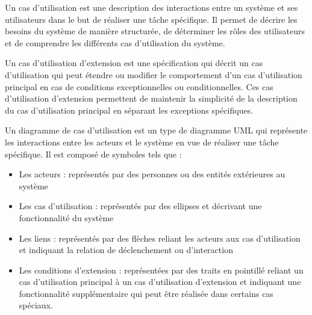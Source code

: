 \begin{definition}
Un cas d'utilisation est une description des interactions entre un système et ses utilisateurs dans le but de réaliser une tâche spécifique. Il permet de décrire les besoins du système de manière structurée, de déterminer les rôles des utilisateurs et de comprendre les différents cas d'utilisation du système.
\end{definition}
\begin{definition}
Un cas d'utilisation d'extension est une spécification qui décrit un cas d'utilisation qui peut étendre ou modifier le comportement d'un cas d'utilisation principal en cas de conditions exceptionnelles ou conditionnelles. Ces cas d'utilisation d'extension permettent de maintenir la simplicité de la description du cas d'utilisation principal en séparant les exceptions spécifiques.
\end{definition}

Un diagramme de cas d'utilisation est un type de diagramme UML qui représente les interactions entre les acteurs et le système en vue de réaliser une tâche spécifique. Il est composé de symboles tels que :
\begin{itemize}
\item Les acteurs : représentés par des personnes ou des entités extérieures au système
\item Les cas d'utilisation : représentés par des ellipses et décrivant une fonctionnalité du système
\item Les liens : représentés par des flèches reliant les acteurs aux cas d'utilisation et indiquant la relation de déclenchement ou d'interaction
\item Les conditions d'extension : représentées par des traits en pointillé reliant un cas d'utilisation principal à un cas d'utilisation d'extension et indiquant une fonctionnalité supplémentaire qui peut être réalisée dans certains cas spéciaux.
\end{itemize}

\newpage
